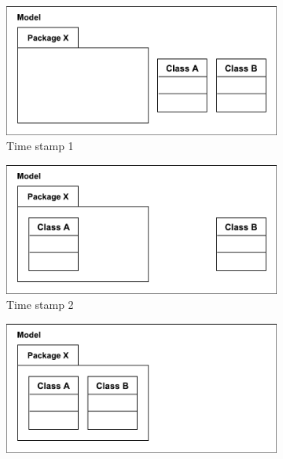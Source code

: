 \documentclass{llncs}
\begin{document}
\begin{figure}[t]
    \begin{subfigure}[t]{0.329\linewidth}
        \centering
        \includegraphics[width=\linewidth]{images/illustration_3}
        \caption{Time stamp 1}
        \label{fig:illustration_3}
    \end{subfigure}
    \begin{subfigure}[t]{0.329\linewidth}
        \centering
        \includegraphics[width=\linewidth]{images/illustration_4}
        \caption{Time stamp 2}
        \label{fig:illustration_4}
    \end{subfigure}
    \begin{subfigure}[t]{0.329\linewidth}
        \centering
        \includegraphics[width=\linewidth]{images/illustration_5}

\end{subfigure}
\end{figure}
\end{document}
